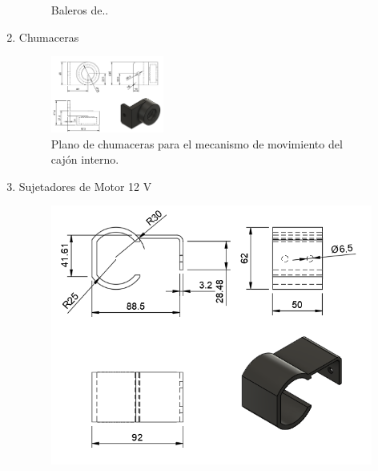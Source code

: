 \begin{enumerate}
\begin{figure}[htpb]
                \caption{Baleros de..}
                \label{fig:etiqueta}
            \end{figure}
        \item Chumaceras 
        \begin{figure}[htpb]
                \centering
                \includegraphics[width=0.35\textwidth]{PLANOS/PLANO_CHUMACERA.png}
                \caption{Plano de chumaceras para el mecanismo de movimiento del cajón interno.}
                \label{fig:etiqueta}
            \end{figure}
        \item Sujetadores de Motor 12 V
            \begin{figure}[h]
            \centering
            \begin{minipage}{0.45\textwidth}
                \centering
                \includegraphics[width=\textwidth]{PLANOS/PLANO_SOPORTE_MOTOR_1.png}
                \caption{}
                \label{fig:imagen1}
            \end{minipage}%
            \hfill
            \begin{minipage}{0.45\textwidth}
                \centering

\end{minipage}
\end{figure}
\end{enumerate}
